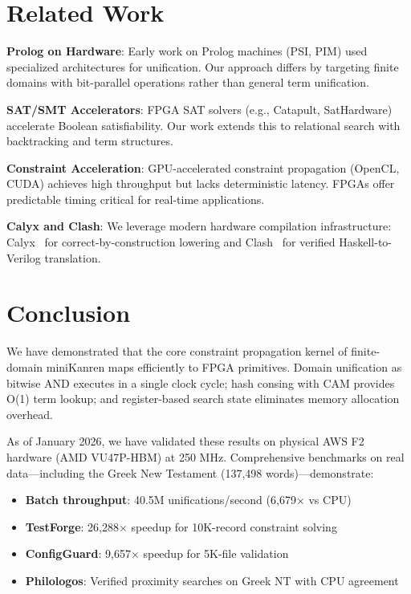 \documentclass[11pt,a4paper]{article}
\begin{document}
\section{Related Work}
\label{sec:related_chirho}

\textbf{Prolog on Hardware}: Early work on Prolog machines (PSI, PIM) used
specialized architectures for unification. Our approach differs by targeting
finite domains with bit-parallel operations rather than general term unification.

\textbf{SAT/SMT Accelerators}: FPGA SAT solvers (e.g., Catapult, SatHardware)
accelerate Boolean satisfiability. Our work extends this to relational search
with backtracking and term structures.

\textbf{Constraint Acceleration}: GPU-accelerated constraint propagation
(OpenCL, CUDA) achieves high throughput but lacks deterministic latency.
FPGAs offer predictable timing critical for real-time applications.

\textbf{Calyx and Clash}: We leverage modern hardware compilation infrastructure:
Calyx~\cite{calyx} for correct-by-construction lowering and Clash~\cite{clash}
for verified Haskell-to-Verilog translation.

\section{Conclusion}
\label{sec:conclusion_chirho}

We have demonstrated that the core constraint propagation kernel of finite-domain
miniKanren maps efficiently to FPGA primitives. Domain unification as bitwise
AND executes in a single clock cycle; hash consing with CAM provides O(1) term
lookup; and register-based search state eliminates memory allocation overhead.

As of January 2026, we have validated these results on physical AWS F2 hardware
(AMD VU47P-HBM) at 250 MHz. Comprehensive benchmarks on real data---including
the Greek New Testament (137,498 words)---demonstrate:

\begin{itemize}
  \item \textbf{Batch throughput}: 40.5M unifications/second (6,679$\times$ vs CPU)
  \item \textbf{TestForge}: 26,288$\times$ speedup for 10K-record constraint solving
  \item \textbf{ConfigGuard}: 9,657$\times$ speedup for 5K-file validation
  \item \textbf{Philologos}: Verified proximity searches on Greek NT with CPU agreement
\end{itemize}
\end{document}
